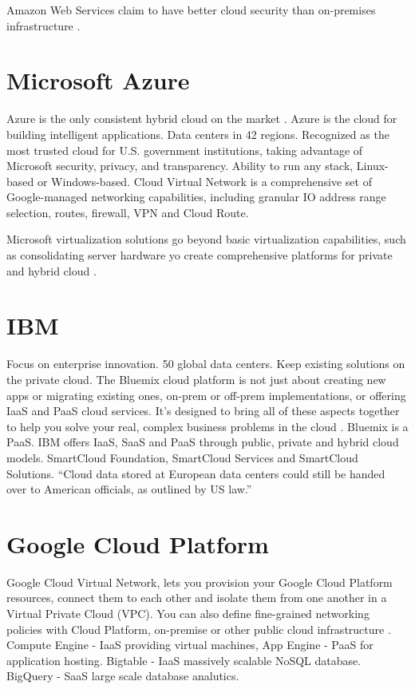 Amazon Web Services claim to have better cloud security than on-premises infrastructure \cite{Amazon}.

\section{Microsoft Azure}
Azure is the only consistent hybrid cloud on the market \cite{Azure}. Azure is the cloud for building intelligent applications. Data centers in 42 regions. Recognized as the most trusted cloud for U.S. government institutions, taking advantage of Microsoft security, privacy, and transparency. Ability to run any stack, Linux-based or Windows-based. Cloud Virtual Network is a comprehensive set of Google-managed networking capabilities, including granular IO address range selection, routes, firewall, VPN and Cloud Route. 

Microsoft virtualization solutions go beyond basic virtualization capabilities, such as consolidating server hardware yo create comprehensive platforms for private and hybrid cloud \cite{predictive}.  


\section{IBM}
Focus on enterprise innovation. 50 global data centers. Keep existing solutions on the private cloud. The Bluemix cloud platform is not just about creating new apps or migrating existing ones, on-prem or off-prem implementations, or offering IaaS and PaaS cloud services. It's designed to bring all of these aspects together to help you solve your real, complex business problems in the cloud \cite{IBM}. Bluemix is a PaaS. IBM offers IaaS, SaaS and PaaS through public, private and hybrid cloud models. SmartCloud Foundation, SmartCloud Services and SmartCloud Solutions. 
\enquote{Cloud data stored at European data centers could still be handed over to American officials, as outlined by US law.}

\section{Google Cloud Platform}

Google Cloud Virtual Network, lets you provision your Google Cloud Platform resources, connect them to each other and isolate them from one another in a Virtual Private Cloud (VPC). You can also define fine-grained networking policies with Cloud Platform, on-premise or other public cloud infrastructure \cite{predictive}. Compute Engine - IaaS providing virtual machines, App Engine - PaaS for application hosting. Bigtable - IaaS massively scalable NoSQL database. BigQuery - SaaS large scale database analutics. 

